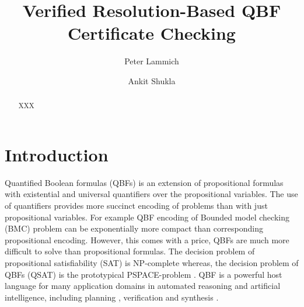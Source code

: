 \documentclass[runningheads]{llncs}
\newcommand{\0}{0}
\newcommand{\1}{1}
\begin{document}

%
\title{Verified Resolution-Based QBF Certificate Checking}


%
\author{Peter Lammich \and Ankit Shukla}

%
%
\maketitle              %
%
\begin{abstract} 
 XXX

\end{abstract}

\section{Introduction}
\label{sec:intro}
Quantified Boolean formulas (QBFs) is an extension of propositional formulas with existential and universal quantifiers over the propositional variables. The use of quantifiers provides more succinct encoding of problems than with just propositional variables. For example QBF encoding of Bounded model checking (BMC) problem \cite{DershowitzHK05} can be exponentially more compact than corresponding propositional encoding. However, this comes with a price, QBFs are much more difficult to solve than propositional formulas. The decision problem of propositional satisfiability (SAT) is NP-complete \cite{Cook71} whereas, the decision problem of QBFs (QSAT) is the prototypical PSPACE-problem \cite{StockmeyerM73}. QBF is a powerful host language for many application domains in automated reasoning and artificial intelligence, including planning \cite{AnsoteguiGS05, EglyKLP17}, verification \cite{MillerSB13} and synthesis \cite{BloemKS14}.
\end{document}
